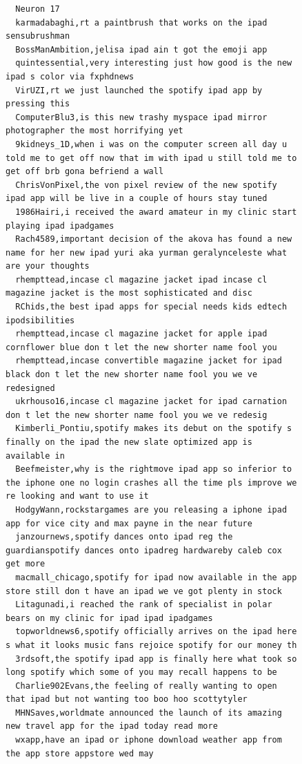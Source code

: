 \begin{figure}[htpb]
\begin{verbatim}
  Neuron 17
  karmadabaghi,rt a paintbrush that works on the ipad sensubrushman
  BossManAmbition,jelisa ipad ain t got the emoji app
  quintessential,very interesting just how good is the new ipad s color via fxphdnews
  VirUZI,rt we just launched the spotify ipad app by pressing this
  ComputerBlu3,is this new trashy myspace ipad mirror photographer the most horrifying yet
  9kidneys_1D,when i was on the computer screen all day u told me to get off now that im with ipad u still told me to get off brb gona befriend a wall
  ChrisVonPixel,the von pixel review of the new spotify ipad app will be live in a couple of hours stay tuned
  1986Hairi,i received the award amateur in my clinic start playing ipad ipadgames
  Rach4589,important decision of the akova has found a new name for her new ipad yuri aka yurman geralynceleste what are your thoughts
  rhempttead,incase cl magazine jacket ipad incase cl magazine jacket is the most sophisticated and disc
  RChids,the best ipad apps for special needs kids edtech ipodsibilities
  rhempttead,incase cl magazine jacket for apple ipad cornflower blue don t let the new shorter name fool you
  rhempttead,incase convertible magazine jacket for ipad black don t let the new shorter name fool you we ve redesigned
  ukrhouso16,incase cl magazine jacket for ipad carnation don t let the new shorter name fool you we ve redesig
  Kimberli_Pontiu,spotify makes its debut on the spotify s finally on the ipad the new slate optimized app is available in
  Beefmeister,why is the rightmove ipad app so inferior to the iphone one no login crashes all the time pls improve we re looking and want to use it
  HodgyWann,rockstargames are you releasing a iphone ipad app for vice city and max payne in the near future
  janzournews,spotify dances onto ipad reg the guardianspotify dances onto ipadreg hardwareby caleb cox get more
  macmall_chicago,spotify for ipad now available in the app store still don t have an ipad we ve got plenty in stock
  Litagunadi,i reached the rank of specialist in polar bears on my clinic for ipad ipad ipadgames
  topworldnews6,spotify officially arrives on the ipad here s what it looks music fans rejoice spotify for our money th
  3rdsoft,the spotify ipad app is finally here what took so long spotify which some of you may recall happens to be
  Charlie902Evans,the feeling of really wanting to open that ipad but not wanting too boo hoo scottytyler
  MHNSaves,worldmate announced the launch of its amazing new travel app for the ipad today read more
  wxapp,have an ipad or iphone download weather app from the app store appstore wed may

\end{verbatim}
\end{figure}
